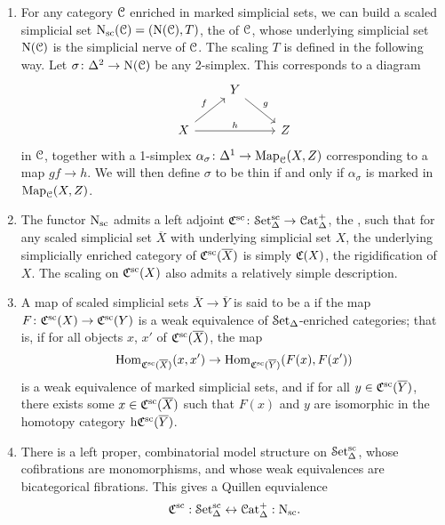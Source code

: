 \documentclass[main.tex]{subfiles}
\begin{document}
\begin{enumerate}
  \item For any category $\mathcal{C}$ enriched in marked simplicial sets, we can build a scaled simplicial set $\mathrm{N}_{\mathrm{sc}}(\mathcal{C}) = (\mathrm{N}(\mathcal{C}), T)$, the  of $\mathcal{C}$, whose underlying simplicial set $\mathrm{N}(\mathcal{C})$ is the simplicial nerve of $\mathcal{C}$. The scaling $T$ is defined in the following way. Let $\sigma\colon \Delta^{2} \to \mathrm{N}(\mathcal{C})$ be any 2-simplex.
    This corresponds to a diagram
    \begin{equation*}
      \begin{tikzcd}
        & Y
        \arrow[dr, "g"]
        \\
        X
        \arrow[ur, "f"]
        \arrow[rr, "h"]
        && Z
      \end{tikzcd}
    \end{equation*}
    in $\mathcal{C}$, together with a 1-simplex $\alpha_{\sigma}\colon \Delta^{1} \to \mathrm{Map}_{\mathcal{C}}(X, Z)$ corresponding to a map $gf \to h$. We will then define $\sigma$ to be thin if and only if $\alpha_{\sigma}$ is marked in $\mathrm{Map}_{\mathcal{C}}(X, Z)$.

  \item The functor $\mathrm{N}_{\mathrm{sc}}$ admits a left adjoint $\mathfrak{C}^{\mathrm{sc}}\colon \mathcal{S}\mathrm{et}_{\Delta}^{\mathrm{sc}} \to \mathcal{C}\mathrm{at}_{\Delta}^{+}$, the , such that for any scaled simplicial set $\overline{X}$ with underlying simplicial set $X$, the underlying simplicially enriched category of $\mathfrak{C}^{\mathrm{sc}}(\overline{X})$ is simply $\mathfrak{C}(X)$, the rigidification of $X$. The scaling on $\mathfrak{C}^{\mathrm{sc}}(X)$ also admits a relatively simple description.

  \item A map of scaled simplicial sets $\overline{X} \to \overline{Y}$ is said to be a  if the map $F\colon \mathfrak{C}^{\mathrm{sc}}(X) \to \mathfrak{C}^{\mathrm{sc}}(Y)$ is a weak equivalence of $\mathcal{S}\mathrm{et}_{\Delta}$-enriched categories; that is, if for all objects $x$, $x'$ of $\mathfrak{C}^{\mathrm{sc}}(\overline{X})$, the map
    \begin{equation*}
      \mathrm{Hom}_{\mathfrak{C}^{\mathrm{sc}}(\overline{X})}(x, x') \to \mathrm{Hom}_{\mathfrak{C}^{\mathrm{sc}}(\overline{Y})}(F(x), F(x'))
    \end{equation*}
    is a weak equivalence of marked simplicial sets, and if for all $y \in \mathfrak{C}^{\mathrm{sc}}(\overline{Y})$, there exists some $x \in \mathfrak{C}^{\mathrm{sc}}(\overline{X})$ such that $F(x)$ and $y$ are isomorphic in the homotopy category $\mathrm{h} \mathfrak{C}^{\mathrm{sc}}(\overline{Y})$.

  \item There is a left proper, combinatorial model structure on $\mathcal{S}\mathrm{et}_{\Delta}^{\mathrm{sc}}$, whose cofibrations are monomorphisms, and whose weak equivalences are bicategorical fibrations. This gives a Quillen equvialence
    \begin{equation*}
      \mathfrak{C}^{\mathrm{sc}} : \mathcal{S}\mathrm{et}_{\Delta}^{\mathrm{sc}} \leftrightarrow \mathcal{C}\mathrm{at}_{\Delta}^{+} : \mathrm{N}_{\mathrm{sc}}.
    \end{equation*}


\end{enumerate}
\end{document}
